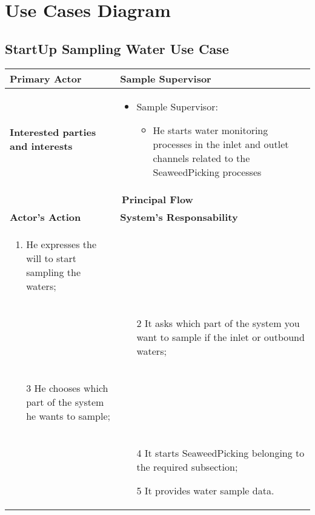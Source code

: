 \section{\textbf{Use Cases Diagram}}

\subsection{StartUp Sampling Water Use Case}

\begin{longtable}{|p{7cm}|p{7cm}|}

\hline
\textbf{Primary Actor}  & Sample Supervisor\\


\hline
\textbf{Interested parties and interests} &
\begin{itemize}
\item Sample Supervisor:
	\begin{itemize}
 	\item He starts water monitoring processes in the inlet and outlet channels related 	to the SeaweedPicking processes

	\end{itemize}
\end{itemize}
\\


\hline
\multicolumn{2}{|c|}{\textbf{Principal Flow}} \\

\hline
\textbf{Actor's Action} & \textbf{System's Responsability}\\

\hline

\begin{enumerate}
\item He expresses the will to start sampling the waters;
\end{enumerate} &\\

& 
\begin{enumerate}
\item[2]It asks which part of the system you want to sample if the inlet or outbound waters;
\end{enumerate}\\

\begin{enumerate}
\item[3]He chooses which part of the system he wants to sample;			
\end{enumerate} &\\


& 
\begin{enumerate}
\item[4]It starts SeaweedPicking belonging to the required subsection;
\item[5]It provides water sample data.
\end{enumerate}\\

\hline
\end{longtable}

